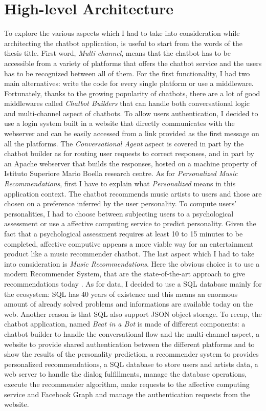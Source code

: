 \documentclass[b5paper,10pt,twoside,cucitura]{toptesi}
\begin{document}
\section{High-level Architecture}

 To explore the various aspects which I had to take into consideration while architecting the chatbot application, is useful to start from the words of the thesis title.
 First word, \textit{Multi-channel}, means that the chatbot has to be
 accessible from a variety of platforms that offers the chatbot service and the users has to be recognized between all of them. For the first functionality, I had two main alternatives: write the code for every single platform or use a middleware. Fortunately, thanks to the growing popularity of chatbots, there are a lot of good middlewares called \textit{Chatbot Builders} that can handle both conversational logic and multi-channel aspect of chatbots. To allow users authentication, I decided to use a login system built in a website that directly communicates with the webserver and can be easily accessed from a link provided as the first message on all the platforms. The \textit{Conversational Agent} aspect is covered in part by the chatbot builder as for routing user requests to correct responses, and in part by an Apache webserver that builds the responses, hosted on a machine property of Istituto Superiore Mario Boella research centre. As for \textit{Personalized Music Recommendations}, first I have to explain what \textit{Personalized} means in this application context. The chatbot recommends music artists to users and those are chosen on a preference inferred by the user personality. To compute users' personalities, I had to choose between subjecting users to a psychological assessment or use a affective computing service to predict personality. Given the fact that a psychological assessment requires at least 10 to 15 minutes to be completed, affective computive appears a more viable way for an entertainment product like a music recommender chatbot.  The last aspect which I had to take into consideration is \textit{Music Recommendations}. Here the obvious choice is to use a modern Recommender System, that are the state-of-the-art approach to give recommendations today  \citep{Singhal}. As for data, I decided to use a SQL database mainly for the ecosystem: SQL has 40 years of existence and this means an enormous amount of already solved problems and informations are available today on the web. Another reason is that SQL also support JSON object storage. 
To recap, the chatbot application, named \textit{Beat in a Bot} is made of different components: a chatbot builder to handle the conversational flow and the multi-channel aspect, a website to provide shared authentication between the different platforms and to show the results of the personality prediction, a recommender system to provides personalized recommendations, a SQL database to store users and artists data, a web server to handle the dialog fulfillments, manage the database operations, execute the recommender algorithm, make requests to the affective computing service and Facebook Graph and manage the authentication requests from the website.
\end{document}
